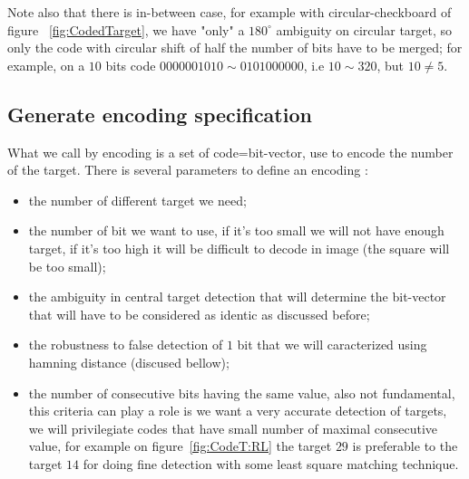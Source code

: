 Note also that there is in-between case, for example with circular-checkboard of figure ~\ref{fig:CodedTarget},
we have "only" a $180^{\circ} $ ambiguity on circular target, so only the code with circular shift
of half the number of bits have to be merged;   for example, on a $10$ bits code $ 0000001010 \sim  0101000000$,
i.e $10 \sim 320$, but $10 \neq 5$.


\subsection{Generate encoding  specification}
\label{GenEncodS}

What we call by encoding is a set of code=bit-vector, use to encode the number of the target.
There is several parameters to define an encoding :

\begin{itemize}
       \item the number of different target we need;

       \item the number of bit we want to use, if it's too small we will not have enough target,
	       if it's too high it will be difficult to decode in image (the square will be too small);

       \item the ambiguity in central target detection that will determine the bit-vector that will
             have to be considered as identic as discussed before;

       \item the robustness to false detection of $1$ bit that we will caracterized using hamning
             distance (discused bellow);

       \item the number of consecutive bits having the same value, also not fundamental, this criteria
             can play a role is we want a very accurate detection of targets, we will privilegiate codes
             that have small number of maximal consecutive value, for example on figure~\ref{fig:CodeT:RL}
	     the target $29$ is preferable to the target $14$ for doing fine detection with some least square
             matching technique.
\end{itemize}

